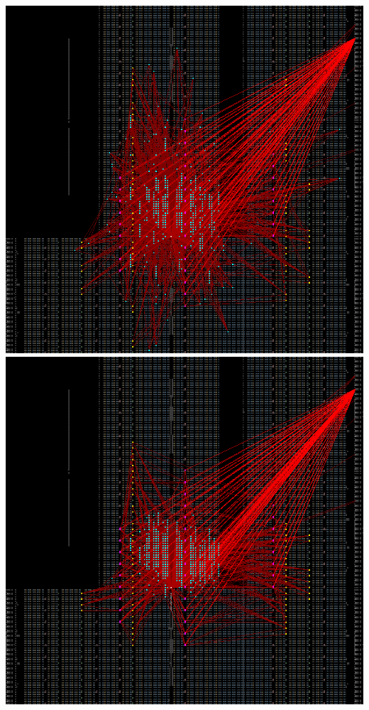 {    \includegraphics[valign=t, scale=0.13]{figures/results/PlacerAnnealHybrid/00000100.png}
    \includegraphics[valign=t, scale=0.13]{figures/results/PlacerAnnealHybrid/00000299.png}
    \label{fig:PAHSnapshots}
}

